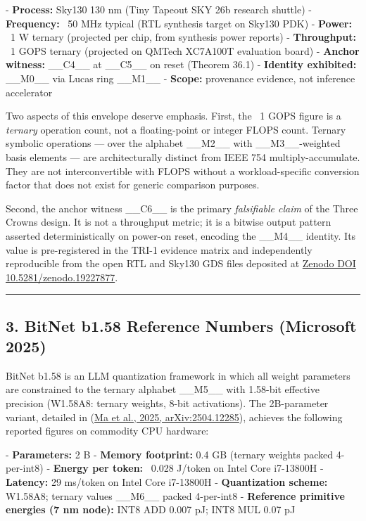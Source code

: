 - \textbf{Process:} Sky130 130 nm (Tiny Tapeout SKY 26b research shuttle)
- \textbf{Frequency:} ~50 MHz typical (RTL synthesis target on Sky130 PDK)
- \textbf{Power:} ~1 W ternary (projected per chip, from synthesis power reports)
- \textbf{Throughput:} ~1 GOPS ternary (projected on QMTech XC7A100T evaluation board)
- \textbf{Anchor witness:} \_\_C4\_\_ at \_\_C5\_\_ on reset (Theorem 36.1)
- \textbf{Identity exhibited:} \_\_M0\_\_ via Lucas ring \_\_M1\_\_
- \textbf{Scope:} provenance evidence, not inference accelerator

Two aspects of this envelope deserve emphasis. First, the ~1 GOPS figure is a \textit{ternary} operation count, not a floating-point or integer FLOPS count. Ternary symbolic operations --- over the alphabet \_\_M2\_\_ with \_\_M3\_\_-weighted basis elements --- are architecturally distinct from IEEE 754 multiply-accumulate. They are not interconvertible with FLOPS without a workload-specific conversion factor that does not exist for generic comparison purposes.

Second, the anchor witness \_\_C6\_\_ is the primary \textit{falsifiable claim} of the Three Crowns design. It is not a throughput metric; it is a bitwise output pattern asserted deterministically on power-on reset, encoding the \_\_M4\_\_ identity. Its value is pre-registered in the TRI-1 evidence matrix and independently reproducible from the open RTL and Sky130 GDS files deposited at \href{https://doi.org/10.5281/zenodo.19227877}{Zenodo DOI 10.5281/zenodo.19227877}.

\noindent\rule{\textwidth}{0.4pt}

\subsection{3. BitNet b1.58 Reference Numbers (Microsoft 2025)}

BitNet b1.58 is an LLM quantization framework in which all weight parameters are constrained to the ternary alphabet \_\_M5\_\_ with 1.58-bit effective precision (W1.58A8: ternary weights, 8-bit activations). The 2B-parameter variant, detailed in (\href{https://arxiv.org/abs/2504.12285}{Ma et al., 2025, arXiv:2504.12285}), achieves the following reported figures on commodity CPU hardware:

- \textbf{Parameters:} 2 B
- \textbf{Memory footprint:} 0.4 GB (ternary weights packed 4-per-int8)
- \textbf{Energy per token:} ~0.028 J/token on Intel Core i7-13800H
- \textbf{Latency:} 29 ms/token on Intel Core i7-13800H
- \textbf{Quantization scheme:} W1.58A8; ternary values \_\_M6\_\_ packed 4-per-int8
- \textbf{Reference primitive energies (7 nm node):} INT8 ADD 0.007 pJ; INT8 MUL 0.07 pJ

